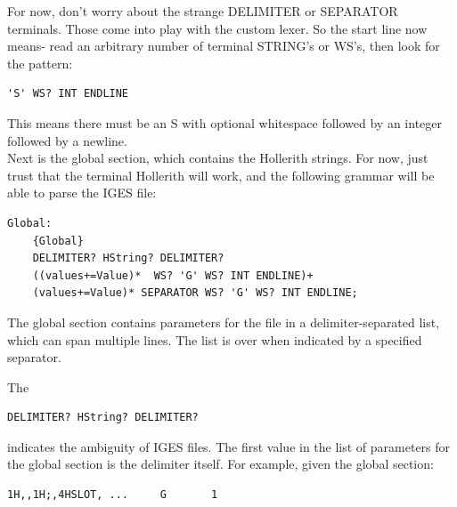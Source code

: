 For now, don't worry about the strange DELIMITER or SEPARATOR terminals. Those come into play with the custom lexer. So the start line now means- read an arbitrary number of terminal STRING's or WS's, then look for the pattern:
\begin{Verbatim}
'S' WS? INT ENDLINE
\end{Verbatim}

  This means there must be an S with optional whitespace followed by an integer followed by a newline. \\
  Next is the global section, which contains the Hollerith strings. For now, just trust that the terminal Hollerith will work, and the following grammar will be able to parse the IGES file:

\begin{Verbatim}
Global:
    {Global}
    DELIMITER? HString? DELIMITER?
    ((values+=Value)*  WS? 'G' WS? INT ENDLINE)+
    (values+=Value)* SEPARATOR WS? 'G' WS? INT ENDLINE;
\end{Verbatim}

The global section contains parameters for the file in a delimiter-separated list, which can span multiple lines. The list is over when indicated by a specified separator.

The \begin{Verbatim}
DELIMITER? HString? DELIMITER?
\end{Verbatim}

indicates the ambiguity of IGES files. The first value in the list of parameters for the global section is the delimiter itself. For example, given the global section:

\begin{Verbatim}
1H,,1H;,4HSLOT, ...     G       1
\end{Verbatim}

